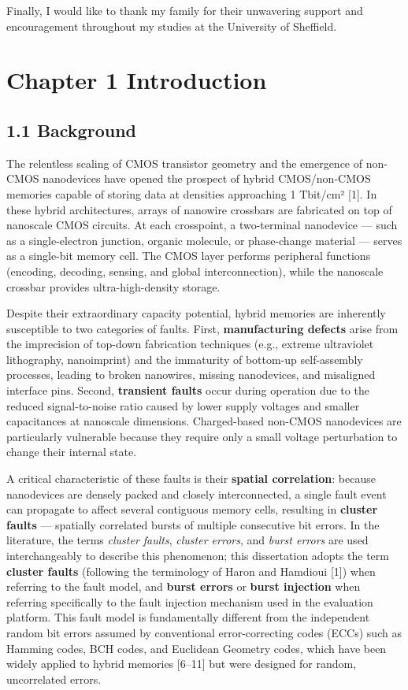Finally, I would like to thank my family for their unwavering support
and encouragement throughout my studies at the University of Sheffield.

\tableofcontents
\newpage

\section{Chapter 1 Introduction}\label{chapter-1-introduction}

\subsection{1.1 Background}\label{background}

The relentless scaling of CMOS transistor geometry and the emergence of
non-CMOS nanodevices have opened the prospect of hybrid CMOS/non-CMOS
memories capable of storing data at densities approaching 1 Tbit/cm²
{[}1{]}. In these hybrid architectures, arrays of nanowire crossbars are
fabricated on top of nanoscale CMOS circuits. At each crosspoint, a
two-terminal nanodevice --- such as a single-electron junction, organic
molecule, or phase-change material --- serves as a single-bit memory
cell. The CMOS layer performs peripheral functions (encoding, decoding,
sensing, and global interconnection), while the nanoscale crossbar
provides ultra-high-density storage.

Despite their extraordinary capacity potential, hybrid memories are
inherently susceptible to two categories of faults. First,
\textbf{manufacturing defects} arise from the imprecision of top-down
fabrication techniques (e.g., extreme ultraviolet lithography,
nanoimprint) and the immaturity of bottom-up self-assembly processes,
leading to broken nanowires, missing nanodevices, and misaligned
interface pins. Second, \textbf{transient faults} occur during operation
due to the reduced signal-to-noise ratio caused by lower supply voltages
and smaller capacitances at nanoscale dimensions. Charged-based non-CMOS
nanodevices are particularly vulnerable because they require only a
small voltage perturbation to change their internal state.

A critical characteristic of these faults is their \textbf{spatial
correlation}: because nanodevices are densely packed and closely
interconnected, a single fault event can propagate to affect several
contiguous memory cells, resulting in \textbf{cluster faults} ---
spatially correlated bursts of multiple consecutive bit errors. In the
literature, the terms \emph{cluster faults}, \emph{cluster errors}, and
\emph{burst errors} are used interchangeably to describe this
phenomenon; this dissertation adopts the term \textbf{cluster faults}
(following the terminology of Haron and Hamdioui {[}1{]}) when referring
to the fault model, and \textbf{burst errors} or \textbf{burst
injection} when referring specifically to the fault injection mechanism
used in the evaluation platform. This fault model is fundamentally
different from the independent random bit errors assumed by conventional
error-correcting codes (ECCs) such as Hamming codes, BCH codes, and
Euclidean Geometry codes, which have been widely applied to hybrid
memories {[}6--11{]} but were designed for random, uncorrelated errors.


